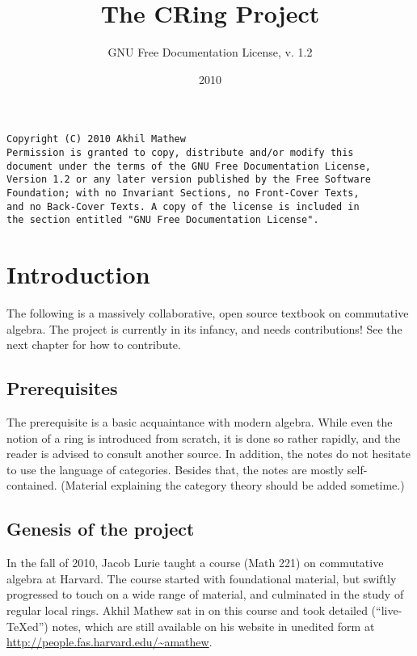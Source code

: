 
\nocite{*}

\title{The CRing Project}
\author{GNU Free Documentation License, v. 1.2}
\date{2010}

\maketitle
\begin{verbatim}
Copyright (C) 2010 Akhil Mathew 
Permission is granted to copy, distribute and/or modify this
document under the terms of the GNU Free Documentation License,
Version 1.2 or any later version published by the Free Software
Foundation; with no Invariant Sections, no Front-Cover Texts,
and no Back-Cover Texts. A copy of the license is included in
the section entitled "GNU Free Documentation License". \end{verbatim}


\fancyhead{}
\fancyfoot{}
\tableofcontents

\newpage 


\pagestyle{fancy}



\chapter*{Introduction}

The following is a massively collaborative, open source textbook on
commutative algebra. The project is currently in its infancy, and needs
contributions! See the next chapter for how to contribute.

\section*{Prerequisites}
The prerequisite  is a basic acquaintance with modern
algebra. While even the notion of a ring is introduced from scratch, it is
done so rather rapidly, and the reader is advised to consult another source.
In addition, the notes do not hesitate to use the language of categories.
Besides that, the notes are mostly self-contained. (Material explaining the
category theory should be added sometime.) 

\section*{Genesis of the project}
In the fall of 2010, Jacob Lurie taught a course (Math 221) on commutative
algebra at Harvard. 
The course started with foundational material, but swiftly progressed to touch on a wide range of
material, and culminated in the study of regular local rings. 
Akhil Mathew sat in on this course and took detailed
(``live-\TeX ed'') notes, which are still available on his website in unedited
form at 
\url{http://people.fas.harvard.edu/~amathew}. 

